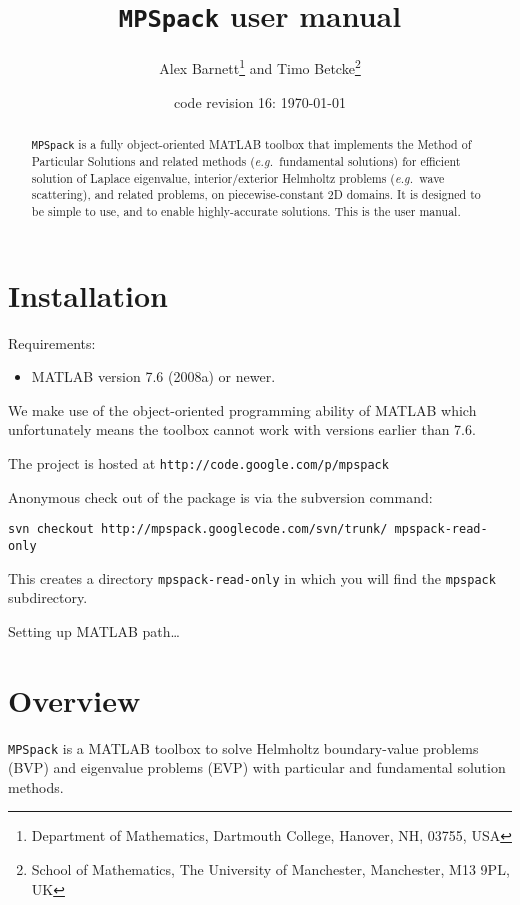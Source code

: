 \documentclass[12pt]{article}
\newcommand{\bi}{\begin{itemize}}
\newcommand{\ei}{\end{itemize}}
\newcommand{\eg}{{\it e.g.\ }}
\begin{document}
\title{{\tt MPSpack} user manual}
\author{Alex Barnett\footnote{Department of Mathematics, Dartmouth College, Hanover, NH, 03755, USA}
and Timo Betcke\footnote{School
of Mathematics, The University of Manchester,
  Manchester, M13 9PL, UK}}
\date{code revision 16: \today}

\maketitle
\begin{abstract}
{\tt MPSpack} is a fully object-oriented MATLAB toolbox that implements the Method of Particular Solutions and related methods (\eg fundamental solutions) for efficient solution of Laplace eigenvalue, interior/exterior Helmholtz problems (\eg wave scattering), and related problems, on piecewise-constant 2D domains.
It is designed to be simple to use, and to enable highly-accurate solutions.
This is the user manual.
\end{abstract}

\section{Installation}

Requirements:
\bi
\item MATLAB version 7.6 (2008a) or newer.
\ei

We make use of the object-oriented programming ability of MATLAB which
unfortunately means the toolbox cannot work with versions earlier than 7.6.


The project is hosted at
{\tt http://code.google.com/p/mpspack}


Anonymous check out of the package is via the subversion command:

{\tt svn checkout http://mpspack.googlecode.com/svn/trunk/ mpspack-read-only}

This creates a directory {\tt mpspack-read-only} in which you will find
the {\tt mpspack} subdirectory.



Setting up MATLAB path\ldots


\section{Overview}

{\tt MPSpack} is a MATLAB toolbox to solve Helmholtz boundary-value
problems (BVP) and
eigenvalue problems (EVP) with particular and fundamental solution methods.
\end{document}
